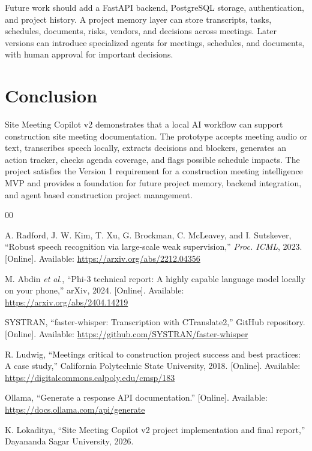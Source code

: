\documentclass[conference]{IEEEtran}
\begin{document}
Future work should add a FastAPI backend, PostgreSQL storage, authentication, and project history. A project memory layer can store transcripts, tasks, schedules, documents, risks, vendors, and decisions across meetings. Later versions can introduce specialized agents for meetings, schedules, and documents, with human approval for important decisions.

\section{Conclusion}
Site Meeting Copilot v2 demonstrates that a local AI workflow can support construction site meeting documentation. The prototype accepts meeting audio or text, transcribes speech locally, extracts decisions and blockers, generates an action tracker, checks agenda coverage, and flags possible schedule impacts. The project satisfies the Version 1 requirement for a construction meeting intelligence MVP and provides a foundation for future project memory, backend integration, and agent based construction project management.

\begin{thebibliography}{00}

A. Radford, J. W. Kim, T. Xu, G. Brockman, C. McLeavey, and I. Sutskever, ``Robust speech recognition via large-scale weak supervision,'' \textit{Proc. ICML}, 2023. [Online]. Available: \url{https://arxiv.org/abs/2212.04356}

M. Abdin \textit{et al.}, ``Phi-3 technical report: A highly capable language model locally on your phone,'' arXiv, 2024. [Online]. Available: \url{https://arxiv.org/abs/2404.14219}

SYSTRAN, ``faster-whisper: Transcription with CTranslate2,'' GitHub repository. [Online]. Available: \url{https://github.com/SYSTRAN/faster-whisper}

R. Ludwig, ``Meetings critical to construction project success and best practices: A case study,'' California Polytechnic State University, 2018. [Online]. Available: \url{https://digitalcommons.calpoly.edu/cmsp/183}

Ollama, ``Generate a response API documentation.'' [Online]. Available: \url{https://docs.ollama.com/api/generate}

K. Lokaditya, ``Site Meeting Copilot v2 project implementation and final report,'' Dayananda Sagar University, 2026.

\end{thebibliography}
\end{document}
